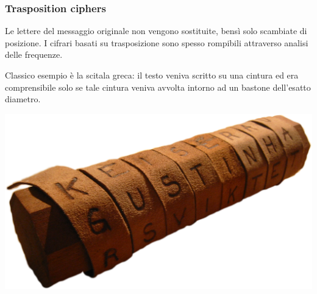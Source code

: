 \documentclass[a4paper, 11pt, notitlepage, fleqn]{report}
\begin{document}
\subsubsection{Trasposition ciphers}
Le lettere del messaggio originale non vengono sostituite, bensì solo scambiate di posizione. I cifrari basati su trasposizione sono spesso rompibili attraverso analisi delle frequenze.\\[0.5em]
\begin{minipage}{.7\textwidth}
	Classico esempio è la scitala greca: il testo veniva scritto su una cintura ed era comprensibile solo se tale cintura veniva avvolta intorno ad un bastone dell'esatto diametro.
\end{minipage}
\begin{minipage}{.3\textwidth}
	\centering
	\includegraphics[width=.8\textwidth]{images/Scytale}
\end{minipage}
\end{document}
